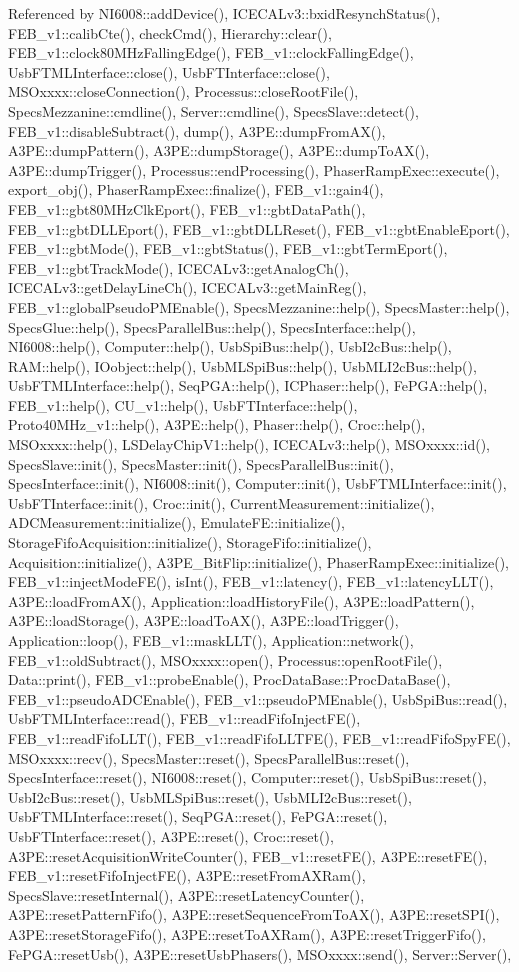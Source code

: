 Referenced by NI6008::addDevice(), ICECALv3::bxidResynchStatus(), FEB\_\-v1::calibCte(), checkCmd(), Hierarchy::clear(), FEB\_\-v1::clock80MHzFallingEdge(), FEB\_\-v1::clockFallingEdge(), UsbFTMLInterface::close(), UsbFTInterface::close(), MSOxxxx::closeConnection(), Processus::closeRootFile(), SpecsMezzanine::cmdline(), Server::cmdline(), SpecsSlave::detect(), FEB\_\-v1::disableSubtract(), dump(), A3PE::dumpFromAX(), A3PE::dumpPattern(), A3PE::dumpStorage(), A3PE::dumpToAX(), A3PE::dumpTrigger(), Processus::endProcessing(), PhaserRampExec::execute(), export\_\-obj(), PhaserRampExec::finalize(), FEB\_\-v1::gain4(), FEB\_\-v1::gbt80MHzClkEport(), FEB\_\-v1::gbtDataPath(), FEB\_\-v1::gbtDLLEport(), FEB\_\-v1::gbtDLLReset(), FEB\_\-v1::gbtEnableEport(), FEB\_\-v1::gbtMode(), FEB\_\-v1::gbtStatus(), FEB\_\-v1::gbtTermEport(), FEB\_\-v1::gbtTrackMode(), ICECALv3::getAnalogCh(), ICECALv3::getDelayLineCh(), ICECALv3::getMainReg(), FEB\_\-v1::globalPseudoPMEnable(), SpecsMezzanine::help(), SpecsMaster::help(), SpecsGlue::help(), SpecsParallelBus::help(), SpecsInterface::help(), NI6008::help(), Computer::help(), UsbSpiBus::help(), UsbI2cBus::help(), RAM::help(), IOobject::help(), UsbMLSpiBus::help(), UsbMLI2cBus::help(), UsbFTMLInterface::help(), SeqPGA::help(), ICPhaser::help(), FePGA::help(), FEB\_\-v1::help(), CU\_\-v1::help(), UsbFTInterface::help(), Proto40MHz\_\-v1::help(), A3PE::help(), Phaser::help(), Croc::help(), MSOxxxx::help(), LSDelayChipV1::help(), ICECALv3::help(), MSOxxxx::id(), SpecsSlave::init(), SpecsMaster::init(), SpecsParallelBus::init(), SpecsInterface::init(), NI6008::init(), Computer::init(), UsbFTMLInterface::init(), UsbFTInterface::init(), Croc::init(), CurrentMeasurement::initialize(), ADCMeasurement::initialize(), EmulateFE::initialize(), StorageFifoAcquisition::initialize(), StorageFifo::initialize(), Acquisition::initialize(), A3PE\_\-BitFlip::initialize(), PhaserRampExec::initialize(), FEB\_\-v1::injectModeFE(), isInt(), FEB\_\-v1::latency(), FEB\_\-v1::latencyLLT(), A3PE::loadFromAX(), Application::loadHistoryFile(), A3PE::loadPattern(), A3PE::loadStorage(), A3PE::loadToAX(), A3PE::loadTrigger(), Application::loop(), FEB\_\-v1::maskLLT(), Application::network(), FEB\_\-v1::oldSubtract(), MSOxxxx::open(), Processus::openRootFile(), Data::print(), FEB\_\-v1::probeEnable(), ProcDataBase::ProcDataBase(), FEB\_\-v1::pseudoADCEnable(), FEB\_\-v1::pseudoPMEnable(), UsbSpiBus::read(), UsbFTMLInterface::read(), FEB\_\-v1::readFifoInjectFE(), FEB\_\-v1::readFifoLLT(), FEB\_\-v1::readFifoLLTFE(), FEB\_\-v1::readFifoSpyFE(), MSOxxxx::recv(), SpecsMaster::reset(), SpecsParallelBus::reset(), SpecsInterface::reset(), NI6008::reset(), Computer::reset(), UsbSpiBus::reset(), UsbI2cBus::reset(), UsbMLSpiBus::reset(), UsbMLI2cBus::reset(), UsbFTMLInterface::reset(), SeqPGA::reset(), FePGA::reset(), UsbFTInterface::reset(), A3PE::reset(), Croc::reset(), A3PE::resetAcquisitionWriteCounter(), FEB\_\-v1::resetFE(), A3PE::resetFE(), FEB\_\-v1::resetFifoInjectFE(), A3PE::resetFromAXRam(), SpecsSlave::resetInternal(), A3PE::resetLatencyCounter(), A3PE::resetPatternFifo(), A3PE::resetSequenceFromToAX(), A3PE::resetSPI(), A3PE::resetStorageFifo(), A3PE::resetToAXRam(), A3PE::resetTriggerFifo(), FePGA::resetUsb(), A3PE::resetUsbPhasers(), MSOxxxx::send(), Server::Server(), 